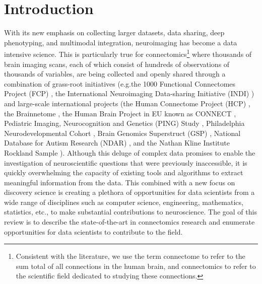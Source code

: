 \documentclass{bmcart}
\begin{document}
\begin{frontmatter}
\begin{abstractbox}
\begin{keyword}
\end{keyword}


\end{abstractbox}
%

\end{frontmatter}

\section{Introduction}

With its new emphasis on collecting larger datasets, data sharing, deep phenotyping, and multimodal integration, neuroimaging has become a data intensive science. This is particularly true for connectomics\footnote{Consistent with the literature, we use the term connectome to refer to the sum total of all connections in the human brain, and connectomics to refer to the scientific field dedicated to studying these connections.} where thousands of brain imaging scans, each of which consist of hundreds of observations of thousands of variables, are being collected and openly shared through a combination of grass-root initiatives (e.g.the 1000 Functional Connectomes Project (FCP) \cite{Biswal2010}, the International Neuroimaging Data-sharing Initiative (INDI) \cite{Mennes2013}) and large-scale international projects (the Human Connectome Project (HCP) \cite{RosenHCP2010,VanEssen2012}, the Brainnetome \cite{Jiang2013}, the Human Brain Project in EU known as CONNECT \cite{Assaf2013}, Pediatric Imaging, Neurocognition and Genetics (PING) Study \cite{JerniganPING}, Philadelphia Neurodevelopmental Cohort \cite{Satterthwaite2014},  Brain Genomics Superstruct (GSP) \cite{BucknerGSP2014}, National Database for Autism Research (NDAR) \cite{NDAR}, and the Nathan Kline Institute Rockland Sample \cite{Nooner2012}). Although this deluge of complex data promises to enable the investigation of neuroscientific questions that were previously inaccessible, it is quickly overwhelming the capacity of existing tools and algorithms to extract meaningful information from the data. This combined with a new focus on discovery science is creating a plethora of opportunities for data scientists from a wide range of disciplines such as computer science, engineering, mathematics, statistics, etc., to make substantial contributions to neuroscience. The goal of this review is to describe the state-of-the-art in connectomics research and enumerate opportunities for data scientists to contribute to the field.
\end{document}
